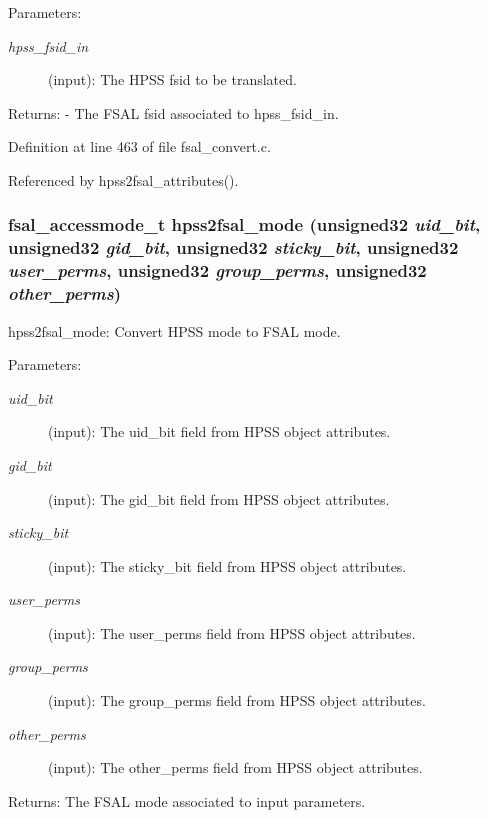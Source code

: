 \begin{Desc}
\item[Parameters:]
\begin{description}
\item[{\em hpss\_\-fsid\_\-in}](input): The HPSS fsid to be translated.\end{description}
\end{Desc}
\begin{Desc}
\item[Returns:]- The FSAL fsid associated to hpss\_\-fsid\_\-in. \end{Desc}


Definition at line 463 of file fsal\_\-convert.c.

Referenced by hpss2fsal\_\-attributes().
\subsubsection[{hpss2fsal\_\-mode}]{\setlength{\rightskip}{0pt plus 5cm}fsal\_\-accessmode\_\-t hpss2fsal\_\-mode (unsigned32 {\em uid\_\-bit}, \/  unsigned32 {\em gid\_\-bit}, \/  unsigned32 {\em sticky\_\-bit}, \/  unsigned32 {\em user\_\-perms}, \/  unsigned32 {\em group\_\-perms}, \/  unsigned32 {\em other\_\-perms})}\label{fsal__convert_8c_dcccec129d19a0f7a97aeb76420caf4e}


hpss2fsal\_\-mode: Convert HPSS mode to FSAL mode.

\begin{Desc}
\item[Parameters:]
\begin{description}
\item[{\em uid\_\-bit}](input): The uid\_\-bit field from HPSS object attributes. \item[{\em gid\_\-bit}](input): The gid\_\-bit field from HPSS object attributes. \item[{\em sticky\_\-bit}](input): The sticky\_\-bit field from HPSS object attributes. \item[{\em user\_\-perms}](input): The user\_\-perms field from HPSS object attributes. \item[{\em group\_\-perms}](input): The group\_\-perms field from HPSS object attributes. \item[{\em other\_\-perms}](input): The other\_\-perms field from HPSS object attributes.\end{description}
\end{Desc}
\begin{Desc}
\item[Returns:]The FSAL mode associated to input parameters. \end{Desc}



